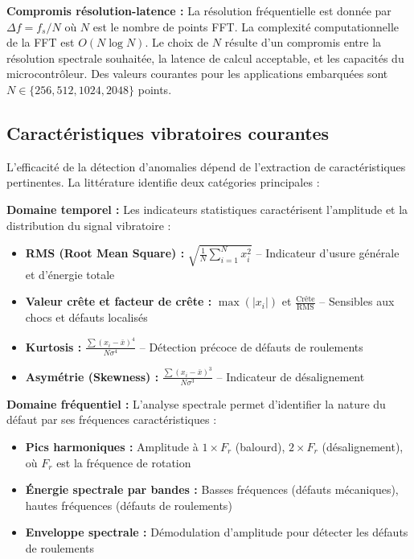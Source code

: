 \textbf{Compromis résolution-latence :} La résolution fréquentielle est donnée par $\Delta f = f_s/N$ où $N$ est le nombre de points FFT. La complexité computationnelle de la FFT est $O(N \log N)$. Le choix de $N$ résulte d'un compromis entre la résolution spectrale souhaitée, la latence de calcul acceptable, et les capacités du microcontrôleur. Des valeurs courantes pour les applications embarquées sont $N \in \{256, 512, 1024, 2048\}$ points.

\subsection{Caractéristiques vibratoires courantes}

L'efficacité de la détection d'anomalies dépend de l'extraction de caractéristiques pertinentes. La littérature identifie deux catégories principales \cite{ran2019,tiboni2022} :

\textbf{Domaine temporel :} Les indicateurs statistiques caractérisent l'amplitude et la distribution du signal vibratoire :
\begin{itemize}
\item \textbf{RMS (Root Mean Square) :} $\sqrt{\frac{1}{N}\sum_{i=1}^{N}x_i^2}$ -- Indicateur d'usure générale et d'énergie totale
\item \textbf{Valeur crête et facteur de crête :} $\max(|x_i|)$ et $\frac{\text{Crête}}{\text{RMS}}$ -- Sensibles aux chocs et défauts localisés
\item \textbf{Kurtosis :} $\frac{\sum(x_i-\bar{x})^4}{N\sigma^4}$ -- Détection précoce de défauts de roulements
\item \textbf{Asymétrie (Skewness) :} $\frac{\sum(x_i-\bar{x})^3}{N\sigma^3}$ -- Indicateur de désalignement
\end{itemize}

\textbf{Domaine fréquentiel :} L'analyse spectrale permet d'identifier la nature du défaut par ses fréquences caractéristiques :
\begin{itemize}
\item \textbf{Pics harmoniques :} Amplitude à $1 \times F_r$ (balourd), $2 \times F_r$ (désalignement), où $F_r$ est la fréquence de rotation
\item \textbf{Énergie spectrale par bandes :} Basses fréquences (défauts mécaniques), hautes fréquences (défauts de roulements)
\item \textbf{Enveloppe spectrale :} Démodulation d'amplitude pour détecter les défauts de roulements
\end{itemize}


